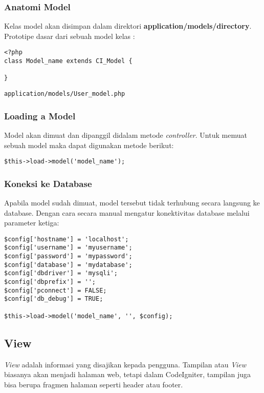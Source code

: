 \subsubsection{Anatomi Model}
\label{sssec:model_1}
Kelas model akan disimpan dalam direktori \textbf{application/models/directory}. Prototipe dasar dari sebuah model kelas :

\begin{lstlisting}[frame=single]  
<?php
class Model_name extends CI_Model {

}
\end{lstlisting}

\begin{lstlisting}[frame=single]  
application/models/User_model.php
\end{lstlisting}

\subsubsection{Loading a Model}
\label{sssec:model_2}

Model akan dimuat dan dipanggil didalam metode \textit{controller}. Untuk memuat sebuah model maka dapat digunakan metode berikut:

\begin{lstlisting}[frame=single] 
$this->load->model('model_name');
\end{lstlisting}

\subsubsection{Koneksi ke Database}
\label{sssec:model_3}
Apabila model sudah dimuat, model tersebut tidak terhubung secara langsung ke database. Dengan cara secara manual mengatur konektivitas database melalui parameter ketiga:

\begin{lstlisting}[frame=single]
$config['hostname'] = 'localhost';
$config['username'] = 'myusername';
$config['password'] = 'mypassword';
$config['database'] = 'mydatabase';
$config['dbdriver'] = 'mysqli';
$config['dbprefix'] = '';
$config['pconnect'] = FALSE;
$config['db_debug'] = TRUE;

$this->load->model('model_name', '', $config);
\end{lstlisting}

\subsection{View}
\textit{View } adalah informasi yang disajikan kepada pengguna. Tampilan atau \textit{View} biasanya akan menjadi halaman web, tetapi dalam CodeIgniter, tampilan juga bisa berupa fragmen halaman seperti header atau footer. 

